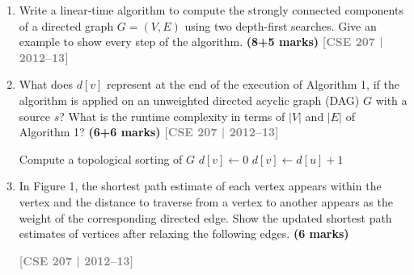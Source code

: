 \documentclass[12pt,a3paper]{article}
\newcommand{\yr}[1]{\hfill\textcolor{gray}{\small\textbf{[#1]}}}
\newcommand{\mk}[1]{\textcolor{orange!70!black}{\small\textbf{(#1 marks)}}}
\begin{document}
\begin{enumerate}
\item Write a linear-time algorithm to compute the strongly connected components of a directed graph $G = (V, E)$ using two depth-first searches. Give an example to show every step of the algorithm. \mk{8+5}
\yr{CSE 207 | 2012--13}

\item What does $d[v]$ represent at the end of the execution of Algorithm 1, if the algorithm is applied on an unweighted directed acyclic graph (DAG) $G$ with a source $s$? What is the runtime complexity in terms of $|V|$ and $|E|$ of Algorithm 1? \mk{6+6}
\yr{CSE 207 | 2012--13}

\begin{algorithm}[H]
\caption{\textsc{LongestPath-DAG}($G$)}
\begin{algorithmic}[1]
\State Compute a topological sorting of $G$
    \State $d[v] \gets 0$
\EndFor
{}
            \State $d[v] \gets d[u] + 1$
        \EndIf
    \EndFor
\EndFor
\end{algorithmic}
\end{algorithm}
 


\item In Figure 1, the shortest path estimate of each vertex appears within the vertex and the distance to traverse from a vertex to another appears as the weight of the corresponding directed edge. Show the updated shortest path estimates of vertices after relaxing the following edges. \mk{6}

\begin{center}
\end{center}
\yr{CSE 207 | 2012--13}


\end{enumerate}
\end{document}
